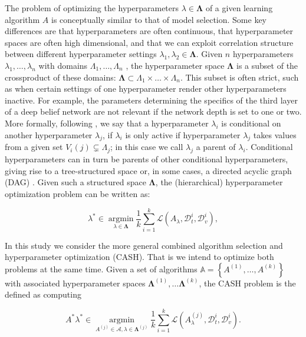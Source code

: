\documentclass[journal]{IEEEtran}
\begin{document}
The problem of optimizing the hyperparameters $\lambda \in \mathbf{\Lambda}$ of a given learning algorithm $A$ is conceptually similar to that of model selection. Some key differences are that hyperparameters are often continuous, that hyperparameter spaces are often high dimensional, and that we can exploit correlation structure between different hyperparameter settings $\lambda_1,\lambda_2 \in \mathbf{\Lambda} $. Given $n$ hyperparameters $\lambda_1, \ldots, \lambda_n$ with domains $\Lambda_1, \ldots, \Lambda_n$ , the hyperparameter space $\mathbf{\Lambda}$ is a subset of the crossproduct of these domains: $\mathbf{\Lambda} \subset \Lambda_1 \times \ldots \times \Lambda_n$. This subset is often strict, such as when certain settings of one hyperparameter render other hyperparameters inactive. For example, the parameters determining the specifics of the third layer of a deep belief network are not relevant if the network depth is set to one or two. More formally, following \cite{Hutter2009}, we say that a hyperparameter $\lambda_i$ is conditional on another hyperparameter $\lambda_j$, if $\lambda_i$ is only active if hyperparameter $\lambda_j$ takes values from a given set $V_i \left(j \right) \subsetneq \Lambda_j$; in this case we call $\lambda_j$ a parent of $\lambda_i$. Conditional hyperparameters can in turn be parents of other conditional hyperparameters, giving rise to a tree-structured space \cite{Bergstra2011} or, in some cases, a directed acyclic graph (DAG) \cite{Hutter2009}. Given such a structured space $\mathbf{\Lambda}$, the (hierarchical) hyperparameter optimization problem can be written as:

\begin{equation}
\lambda^* \in \underset{\lambda \in \mathbf{\Lambda}}{\operatorname{argmin}} \frac{1}{k} \sum_{i=1}^{k} \mathcal{L} \left( A_{\lambda}, \mathcal{D}^{i}_{t},  \mathcal{D}^{i}_{v} \right),
\end{equation}

In this study we consider the more general combined algorithm selection and hyperparameter optimization (CASH). That is we intend to optimize both problems at the same time. Given a set of algorithms $\mathbb{A} = \left\lbrace A^{(1)}, \ldots, A^{(k)} \right\rbrace$ with associated hyperparameter spaces $\mathbf{\Lambda}^{(1)}, \ldots \mathbf{\Lambda}^{(k)}$, the CASH problem is the defined as computing

\begin{equation}
A^* \lambda^* \in \underset{A^{(j)} \in \mathcal{A}, \lambda \in \mathbf{\Lambda}^{(j)}}{\operatorname{argmin}} \frac{1}{k} \sum_{i=1}^{k} \mathcal{L} \left( A_{\lambda}^{(j)}, \mathcal{D}^{i}_{t},  \mathcal{D}^{i}_{v} \right).
\end{equation}
\end{document}
